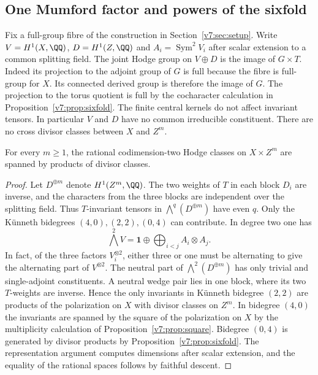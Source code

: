 \subsection{One Mumford factor and powers of the sixfold}\label{v7:ssec:mixed-single}

Fix a full-group fibre of the construction in Section~\ref{v7:sec:setup}.
Write $V=H^1(X,\QQ)$, $D=H^1(Z,\QQ)$ and $A_i=\operatorname{Sym}^2V_i$
after scalar extension to a common splitting field. The joint Hodge group
on $V\oplus D$ is the image of $G\times T$. Indeed its projection to the
adjoint group of $G$ is full because the fibre is full-group for $X$.
Its connected derived group is therefore the image of $G$. The projection
to the torus quotient is full by the cocharacter calculation in
Proposition~\ref{v7:prop:sixfold}. The finite central kernels do not affect
invariant tensors. In particular $V$ and $D$ have no common irreducible
constituent. There are no cross divisor classes between $X$ and $Z^m$.

\begin{proposition}\label{v7:prop:single-x-codim2}
For every $m\ge 1$, the rational codimension-two Hodge classes on
$X\times Z^m$ are spanned by products of divisor classes.
\end{proposition}

\begin{proof}
Let $D^{\oplus m}$ denote $H^1(Z^m,\QQ)$. The two weights of $T$ in each
block $D_i$ are inverse, and the characters from the three blocks are
independent over the splitting field. Thus $T$-invariant tensors in
$\bigwedge^q(D^{\oplus m})$ have even $q$. Only the K\"unneth bidegrees
$(4,0),(2,2),(0,4)$ can contribute. In degree two one has
\[
 \bigwedge^2V=\mathbf 1\oplus\bigoplus_{i<j}A_i\otimes A_j.
\]
In fact, of the three factors $V_i^{\otimes 2}$, either three or one
must be alternating to give the alternating part of $V^{\otimes 2}$.
The neutral part of $\bigwedge^2(D^{\oplus m})$ has only trivial and
single-adjoint constituents. A neutral wedge pair lies in one block,
where its two $T$-weights are inverse. Hence the only invariants in
K\"unneth bidegree $(2,2)$ are products of the polarization on $X$
with divisor classes on $Z^m$. In bidegree $(4,0)$ the invariants are
spanned by the square of the polarization on $X$ by the multiplicity
calculation of Proposition~\ref{v7:prop:square}. Bidegree $(0,4)$ is
generated by divisor products by Proposition~\ref{v7:prop:sixfold}.
The representation argument computes dimensions after scalar extension,
and the equality of the rational spaces follows by faithful descent.
\end{proof}

